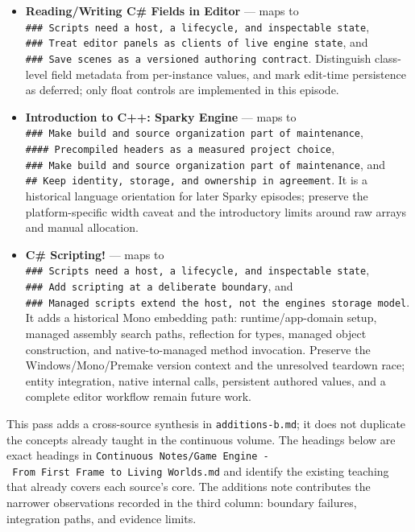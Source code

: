 \begin{itemize}
\item
  \textbf{Reading/Writing C\# Fields in Editor} --- maps to \texttt{\#\#\#\ Scripts\ need\ a\ host,\ a\ lifecycle,\ and\ inspectable\ state}, \texttt{\#\#\#\ Treat\ editor\ panels\ as\ clients\ of\ live\ engine\ state}, and \texttt{\#\#\#\ Save\ scenes\ as\ a\ versioned\ authoring\ contract}. Distinguish class-level field metadata from per-instance values, and mark edit-time persistence as deferred; only float controls are implemented in this episode.
\item
  \textbf{Introduction to C++: Sparky Engine} --- maps to \texttt{\#\#\#\ Make\ build\ and\ source\ organization\ part\ of\ maintenance}, \texttt{\#\#\#\#\ Precompiled\ headers\ as\ a\ measured\ project\ choice}, \texttt{\#\#\#\ Make\ build\ and\ source\ organization\ part\ of\ maintenance}, and \texttt{\#\#\ Keep\ identity,\ storage,\ and\ ownership\ in\ agreement}. It is a historical language orientation for later Sparky episodes; preserve the platform-specific width caveat and the introductory limits around raw arrays and manual allocation.
\item
  \textbf{C\# Scripting!} --- maps to \texttt{\#\#\#\ Scripts\ need\ a\ host,\ a\ lifecycle,\ and\ inspectable\ state}, \texttt{\#\#\#\ Add\ scripting\ at\ a\ deliberate\ boundary}, and \texttt{\#\#\#\ Managed\ scripts\ extend\ the\ host,\ not\ the\ engine\textquotesingle{}s\ storage\ model}. It adds a historical Mono embedding path: runtime/app-domain setup, managed assembly search paths, reflection for types, managed object construction, and native-to-managed method invocation. Preserve the Windows/Mono/Premake version context and the unresolved teardown race; entity integration, native internal calls, persistent authored values, and a complete editor workflow remain future work.
\end{itemize}

This pass adds a cross-source synthesis in \texttt{additions-b.md}; it does not duplicate the concepts already taught in the continuous volume. The headings below are exact headings in \texttt{Continuous\ Notes/Game\ Engine\ -\ From\ First\ Frame\ to\ Living\ Worlds.md} and identify the existing teaching that already covers each source's core. The additions note contributes the narrower observations recorded in the third column: boundary failures, integration paths, and evidence limits.

